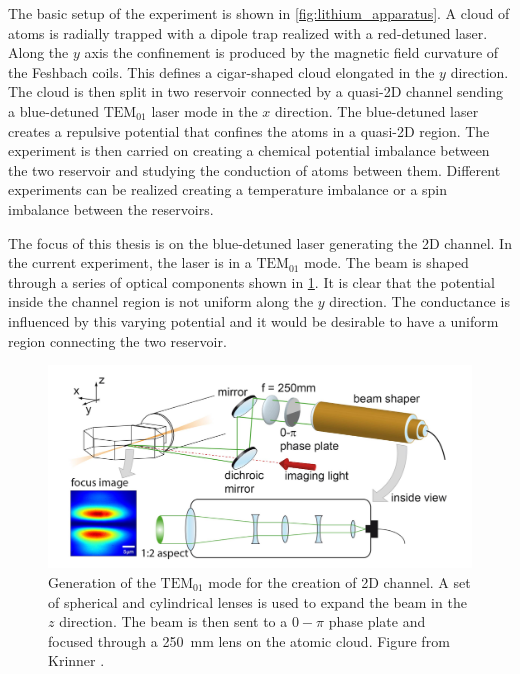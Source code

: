 The basic setup of the experiment is shown in \cref{fig:lithium_apparatus}. A cloud of atoms is radially trapped with a dipole trap realized with a red-detuned laser. Along the $y$ axis the confinement is produced by the magnetic field curvature of the Feshbach coils. This defines a cigar-shaped cloud elongated in the $y$ direction. The cloud is then split in two reservoir connected by a quasi-2D channel sending a blue-detuned $\text{TEM}_{01}$ laser mode in the $x$ direction. The blue-detuned laser creates a repulsive potential that confines the atoms in a quasi-2D region. The experiment is then carried on creating a chemical potential imbalance between the two reservoir and studying the conduction of atoms between them. Different experiments can be realized creating a temperature imbalance or a spin imbalance between the reservoirs.

The focus of this thesis is on the blue-detuned laser generating the 2D channel. In the current experiment, the laser is in a $\text{TEM}_{01}$ mode. The beam is shaped through a series of optical components shown in \cref{fig:beam_shaper}. It is clear that the potential inside the channel region is not uniform along the $y$ direction. The conductance is influenced by this varying potential and it would be desirable to have a uniform region connecting the two reservoir.

\begin{figure}
    \includegraphics[width=\textwidth]{chapters/chapter_1/figures/beam_shaper.png}
    \caption[short]{Generation of the $\text{TEM}_{01}$ mode for the creation of 2D channel. A set of spherical and cylindrical lenses is used to expand the beam in the $z$ direction. The beam is then sent to a $0-\pi$ phase plate and focused through a \SI{250}{mm} lens on the atomic cloud. Figure from Krinner \cite{krinner2015}.}
    \label{fig:beam_shaper}
\end{figure}

